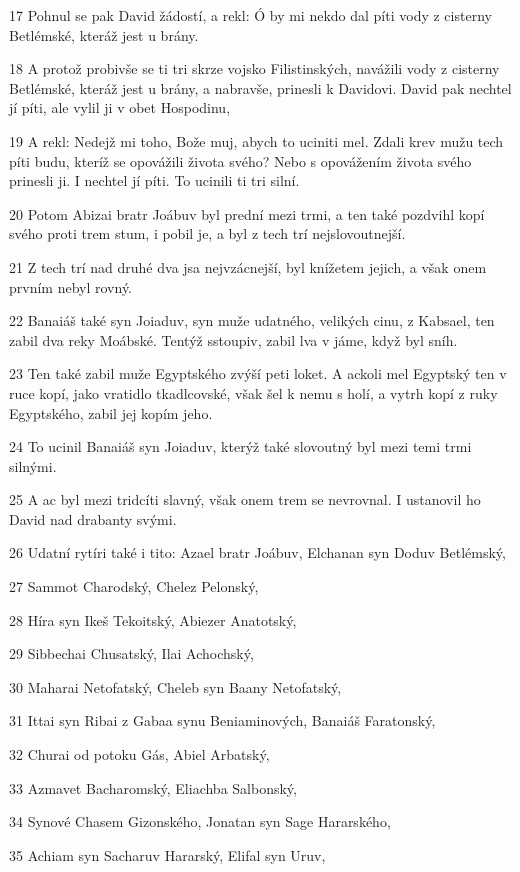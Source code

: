 \par 17 Pohnul se pak David žádostí, a rekl: Ó by mi nekdo dal píti vody z cisterny Betlémské, kteráž jest u brány.
\par 18 A protož probivše se ti tri skrze vojsko Filistinských, navážili vody z cisterny Betlémské, kteráž jest u brány, a nabravše, prinesli k Davidovi. David pak nechtel jí píti, ale vylil ji v obet Hospodinu,
\par 19 A rekl: Nedejž mi toho, Bože muj, abych to uciniti mel. Zdali krev mužu tech píti budu, kteríž se opovážili života svého? Nebo s opovážením života svého prinesli ji. I nechtel jí píti. To ucinili ti tri silní.
\par 20 Potom Abizai bratr Joábuv byl prední mezi trmi, a ten také pozdvihl kopí svého proti trem stum, i pobil je, a byl z tech trí nejslovoutnejší.
\par 21 Z tech trí nad druhé dva jsa nejvzácnejší, byl knížetem jejich, a však onem prvním nebyl rovný.
\par 22 Banaiáš také syn Joiaduv, syn muže udatného, velikých cinu, z Kabsael, ten zabil dva reky Moábské. Tentýž sstoupiv, zabil lva v jáme, když byl sníh.
\par 23 Ten také zabil muže Egyptského zvýší peti loket. A ackoli mel Egyptský ten v ruce kopí, jako vratidlo tkadlcovské, však šel k nemu s holí, a vytrh kopí z ruky Egyptského, zabil jej kopím jeho.
\par 24 To ucinil Banaiáš syn Joiaduv, kterýž také slovoutný byl mezi temi trmi silnými.
\par 25 A ac byl mezi tridcíti slavný, však onem trem se nevrovnal. I ustanovil ho David nad drabanty svými.
\par 26 Udatní rytíri také i tito: Azael bratr Joábuv, Elchanan syn Doduv Betlémský,
\par 27 Sammot Charodský, Chelez Pelonský,
\par 28 Híra syn Ikeš Tekoitský, Abiezer Anatotský,
\par 29 Sibbechai Chusatský, Ilai Achochský,
\par 30 Maharai Netofatský, Cheleb syn Baany Netofatský,
\par 31 Ittai syn Ribai z Gabaa synu Beniaminových, Banaiáš Faratonský,
\par 32 Churai od potoku Gás, Abiel Arbatský,
\par 33 Azmavet Bacharomský, Eliachba Salbonský,
\par 34 Synové Chasem Gizonského, Jonatan syn Sage Hararského,
\par 35 Achiam syn Sacharuv Hararský, Elifal syn Uruv,
